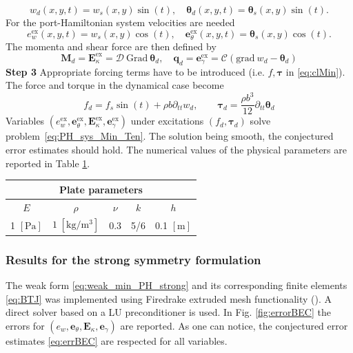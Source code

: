 \documentclass{ifacconf}
\begin{document}
\[
w_d(x,y,t) = w_s(x,y) \sin(t), \quad \bm{\theta}_d(x,y,t) = \bm\theta_s(x,y) \sin(t).
\]
For the port-Hamiltonian system velocities are needed
\[
e_w^\text{ex}(x,y,t) = w_s(x,y) \cos(t), \quad \bm{e}_\theta^\text{ex}(x,y,t) = \bm\theta_s(x,y) \cos(t).
\]
The momenta and shear force are then defined by
\[
\bm{M}_d = \bm{E}_\kappa^\text{ex} =  \mathcal{D} \ \mathrm{Grad} \ \bm{\theta}_d, \quad \bm{q}_d = \bm{e}_\gamma^\text{ex} = \mathcal{C}(\mathrm{grad} \ w_d - \bm{\theta}_d)
\]
\textbf{Step 3 } Appropriate forcing terms have to be introduced (i.e. $f, \bm{\tau}$ in \eqref{eq:clMin}). The force and torque in the dynamical case become
\begin{equation*}
f_d = f_s \sin(t) + \rho b \partial_{tt} w_d, \qquad
\bm{\tau}_d = \frac{\rho b^3}{12} \partial_{tt} \bm{\theta}_d
\end{equation*}
Variables $(e_w^\text{ex}, \bm{e}_\theta^\text{ex}, \bm{E}_\kappa^\text{ex}, \bm{e}_\gamma^\text{ex})$ under excitations $(f_d, \bm{\tau}_d)$ solve problem~\eqref{eq:PH_sys_Min_Ten}. The solution being smooth, the conjectured error estimates should hold. The numerical values of the physical parameters are reported in Table \ref{tab:parMin}.

\begin{table}[h]
	\centering
	\begin{tabular}{ccccc}
		\hline 
		\multicolumn{5}{c}{Plate parameters} \\ 
		\hline 
		$E$ & $\rho$ & $\nu$ & $k$ & $h$ \\
		1 $[\textrm{Pa}]$ & $1\; [\textrm{kg}/\textrm{m}^3]$ & 0.3 & 5/6 & 0.1 $[\textrm{m}]$\\ 
		\hline 
	\end{tabular} 
	\captionsetup{width=0.95\linewidth}
	\vspace{1mm}
	\label{tab:parMin}
\end{table}

\subsubsection{Results for the strong symmetry formulation} 

The weak form \eqref{eq:weak_min_PH_strong} and its corresponding finite elements \eqref{eq:BTJ} was implemented using Firedrake extruded mesh functionality (\cite{firedrake_extruded}). A direct solver based on a LU preconditioner is used. In Fig. \ref{fig:errorBEC} the errors for $(e_w, \bm{e}_\theta, \bm{E}_\kappa, \bm{e}_\gamma)$ are reported. As one can notice, the conjectured error estimates \eqref{eq:errBEC} are respected for all variables. 
\end{document}
